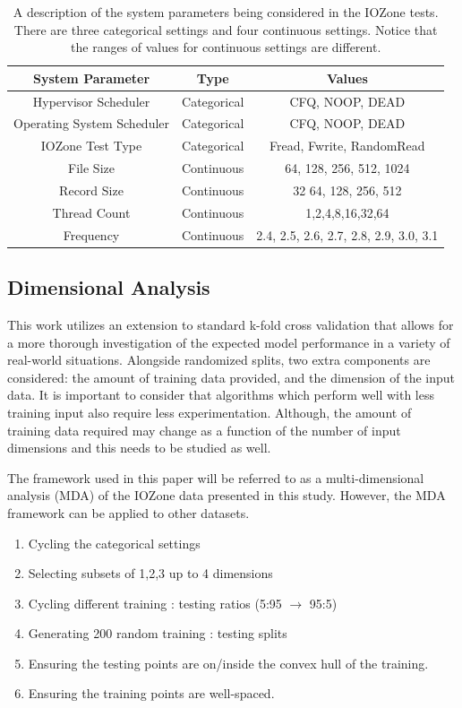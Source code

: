 \documentclass{scspaperproc}
\theoremstyle{scsthe}
\begin{document}
\begin{table}
  \centering
  \begin{tabular}{|c|c|c|}
    \hline
    \textbf{System Parameter} & \textbf{Type} & \textbf{Values}\\
    \hline
    Hypervisor Scheduler & Categorical & CFQ, NOOP, DEAD\\
    Operating System Scheduler & Categorical & CFQ, NOOP, DEAD\\
    IOZone Test Type & Categorical & Fread, Fwrite, RandomRead\\
    File Size & Continuous & 64, 128, 256, 512, 1024\\
    Record Size & Continuous & 32 64, 128, 256, 512\\
    Thread Count & Continuous & 1,2,4,8,16,32,64\\
    Frequency & Continuous & 2.4, 2.5, 2.6, 2.7, 2.8, 2.9, 3.0, 3.1\\
    \hline
  \end{tabular}
  \caption{A description of the system parameters being considered in
    the IOZone tests. There are three categorical settings and four
    continuous settings. Notice that the ranges of values for
    continuous settings are different.}
  \label{tab:data_type}
\end{table}

\subsection{Dimensional Analysis}
This work utilizes an extension to standard k-fold cross validation
that allows for a more thorough investigation of the expected model
performance in a variety of real-world situations. Alongside
randomized splits, two extra components are considered: the amount of
training data provided, and the dimension of the input data. It is
important to consider that algorithms which perform well with less
training input also require less experimentation. Although, the amount
of training data required may change as a function of the number of
input dimensions and this needs to be studied as well.

The framework used in this paper will be referred to as a
multi-dimensional analysis (MDA) of the IOZone data presented in this
study. However, the MDA framework can be applied to other datasets.

\begin{enumerate}
\item Cycling the categorical settings
\item Selecting subsets of 1,2,3 up to 4 dimensions
\item Cycling different training : testing ratios (5:95 $\rightarrow$ 95:5)
\item Generating 200 random training : testing splits
\item Ensuring the testing points are on/inside the convex hull of the training.
\item Ensuring the training points are well-spaced.
\end{enumerate}
\end{document}
